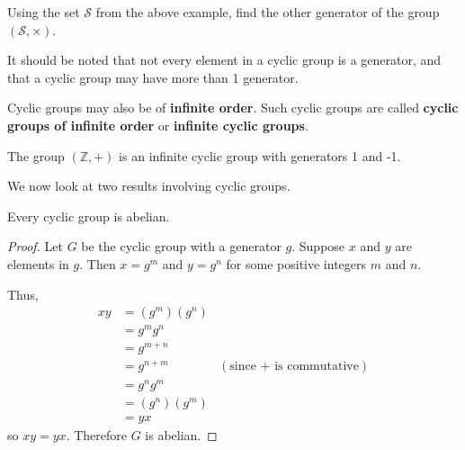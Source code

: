 \begin{exercise}
    Using the set $\mathcal{S}$ from the above example, find the other generator of the group $(\mathcal{S}, \times)$.
\end{exercise}

It should be noted that not every element in a cyclic group is a generator, and that a cyclic group may have more than 1 generator.

Cyclic groups may also be of \textbf{infinite order}. Such cyclic groups are called \textbf{cyclic groups of infinite order} or \textbf{infinite cyclic groups}.
\begin{example}
    The group $(\mathbb{Z}, +)$ is an infinite cyclic group with generators 1 and -1.
\end{example}

We now look at two results involving cyclic groups.

\begin{proposition}\label{prop-cyclic-group-is-abelian}
    Every cyclic group is abelian.
\end{proposition}
\begin{proof}
    Let $G$ be the cyclic group with a generator $g$. Suppose $x$ and $y$ are elements in $g$. Then $x = g^m$ and $y = g^n$ for some positive integers $m$ and $n$.

    Thus,
    \begin{align*}
        xy &= (g^m)(g^n)\\
        &= g^mg^n\\
        &= g^{m+n}\\
        &= g^{n+m} & (\text{since + is commutative})\\
        &= g^ng^m\\
        &= (g^n)(g^m)\\
        &= yx
    \end{align*}
    so $xy = yx$. Therefore $G$ is abelian.
\end{proof}

